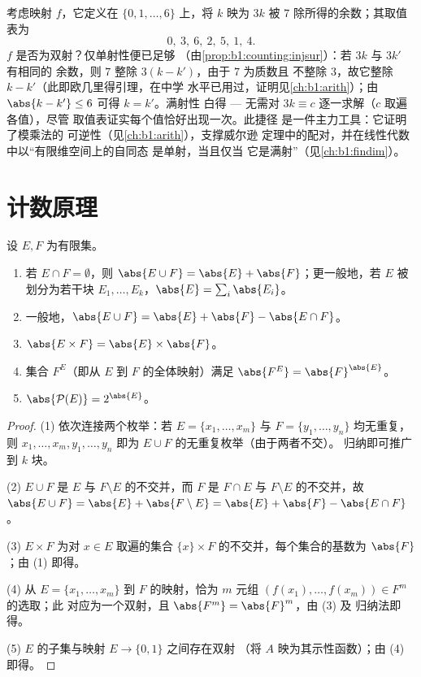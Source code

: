 \begin{example}[白得的一半]\label{ex:b1:counting:mod7}
考虑映射 $f$，它定义在 $\{0, 1, \dots, 6\}$ 上，将 $k$ 映为
$3k$ 被 $7$ 除所得的余数；其取值表为
\[
0,\ 3,\ 6,\ 2,\ 5,\ 1,\ 4 .
\]
$f$ 是否为双射？仅单射性便已足够
（由\cref{prop:b1:counting:injsur}）：若 $3k$ 与 $3k'$ 有相同的
余数，则 $7$ 整除 $3(k - k')$，由于 $7$ 为质数且
不整除 $3$，故它整除 $k - k'$（此即欧几里得引理，在中学
水平已用过，证明见\cref{ch:b1:arith}）；由
$\abs{k - k'} \leq 6$ 可得 $k = k'$。满射性
白得 --- 无需对 $3k \equiv c$ 逐一求解（$c$ 取遍各值），尽管
取值表证实每个值恰好出现一次。此捷径
是一件主力工具：它证明了模乘法的
可逆性（见\cref{ch:b1:arith}），支撑威尔逊
定理中的配对，并在线性代数中以“有限维空间上的自同态
是单射，当且仅当
它是满射”（见\cref{ch:b1:findim}）。
\end{example}

\section{计数原理}

\begin{proposition}[加法与乘法法则]\label{prop:b1:counting:rules}
设 $E, F$ 为有限集。
\begin{enumerate}
  \item 若 $E \cap F = \emptyset$，则 $\abs{E \cup F} = \abs{E} +
        \abs{F}$；更一般地，若 $E$ 被划分为若干块
        $E_1, \dots, E_k$，$\abs{E} = \sum_i \abs{E_i}$。
  \item 一般地，$\abs{E \cup F} = \abs{E} + \abs{F} - \abs{E \cap
        F}$。
  \item $\abs{E \times F} = \abs{E} \times \abs{F}$。
  \item 集合 $F^E$（即从 $E$ 到 $F$ 的全体映射）满足
        $\abs{F^E} = \abs{F}^{\abs{E}}$。
  \item $\abs{\mathcal{P}(E)} = 2^{\abs{E}}$。
\end{enumerate}
\end{proposition}

\begin{proof}
(1) 依次连接两个枚举：若 $E = \{x_1, \dots, x_m\}$ 与 $F =
\{y_1, \dots, y_n\}$ 均无重复，则 $x_1, \dots, x_m, y_1,
\dots, y_n$ 即为 $E \cup F$ 的无重复枚举（由于两者不交）。
归纳即可推广到 $k$ 块。

(2) $E \cup F$ 是 $E$ 与 $F \setminus E$ 的不交并，而
$F$ 是 $F \cap E$ 与 $F \setminus E$ 的不交并，故
$\abs{E \cup F} = \abs{E} + \abs{F \setminus E} = \abs{E} + \abs{F} -
\abs{E \cap F}$。

(3) $E \times F$ 为对 $x \in E$ 取遍的集合
$\{x\} \times F$ 的不交并，每个集合的基数为 $\abs{F}$；由 (1) 即得。

(4) 从 $E = \{x_1, \dots, x_m\}$ 到 $F$ 的映射，恰为
$m$ 元组 $(f(x_1), \dots, f(x_m)) \in F^m$ 的选取；此
对应为一个双射，且 $\abs{F^m} = \abs{F}^m$，由 (3) 及
归纳法即得。

(5) $E$ 的子集与映射 $E \to \{0, 1\}$ 之间存在双射
（将 $A$ 映为其示性函数）；由 (4) 即得。
\end{proof}

